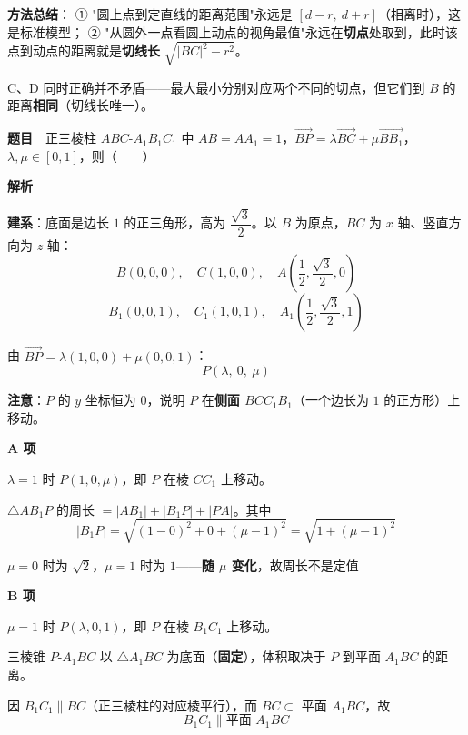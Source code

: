 
\begin{gktip}
\textbf{方法总结}：
① "圆上点到定直线的距离范围"永远是 $[d-r,\ d+r]$（相离时），这是标准模型；
② "从圆外一点看圆上动点的视角最值"永远在\textbf{切点}处取到，此时该点到动点的距离就是\textbf{切线长} $\sqrt{|BC|^{2}-r^{2}}$。

C、D 同时正确并不矛盾——最大最小分别对应两个不同的切点，但它们到 $B$ 的距离\textbf{相同}（切线长唯一）。
\end{gktip}

\par\medskip


\textbf{题目}　正三棱柱 $ABC\text{-}A_1B_1C_1$ 中 $AB=AA_1=1$，$\overrightarrow{BP}=\lambda\overrightarrow{BC}+\mu\overrightarrow{BB_1}$，$\lambda,\mu\in[0,1]$，则（　　）

\textbf{解析}

\textbf{建系}：底面是边长 $1$ 的正三角形，高为 $\dfrac{\sqrt3}2$。以 $B$ 为原点，$BC$ 为 $x$ 轴、竖直方向为 $z$ 轴：
\[B(0,0,0),\quad C(1,0,0),\quad A\left(\frac12,\frac{\sqrt3}2,0\right)\]
\[B_1(0,0,1),\quad C_1(1,0,1),\quad A_1\left(\frac12,\frac{\sqrt3}2,1\right)\]

由 $\overrightarrow{BP}=\lambda(1,0,0)+\mu(0,0,1)$：
\[P(\lambda,\ 0,\ \mu)\]

\textbf{注意}：$P$ 的 $y$ 坐标恒为 $0$，说明 $P$ 在\textbf{侧面 $BCC_1B_1$}（一个边长为 $1$ 的正方形）上移动。

\par\medskip

\textbf{A 项 }

$\lambda=1$ 时 $P(1,0,\mu)$，即 $P$ 在棱 $CC_1$ 上移动。

$\triangle AB_1P$ 的周长 $=\left|AB_1\right|+\left|B_1P\right|+|PA|$。其中
\[\left|B_1P\right|=\sqrt{(1-0)^{2}+0+(\mu-1)^{2}}=\sqrt{1+(\mu-1)^{2}}\]

$\mu=0$ 时为 $\sqrt2$，$\mu=1$ 时为 $1$——\textbf{随 $\mu$ 变化}，故周长不是定值 

\par\medskip

\textbf{B 项 }

$\mu=1$ 时 $P(\lambda,0,1)$，即 $P$ 在棱 $B_1C_1$ 上移动。

三棱锥 $P\text{-}A_1BC$ 以 $\triangle A_1BC$ 为底面（\textbf{固定}），体积取决于 $P$ 到平面 $A_1BC$ 的距离。

因 $B_1C_1\parallel BC$（正三棱柱的对应棱平行），而 $BC\subset$ 平面 $A_1BC$，故
\[B_1C_1\parallel\text{平面 }A_1BC\]

